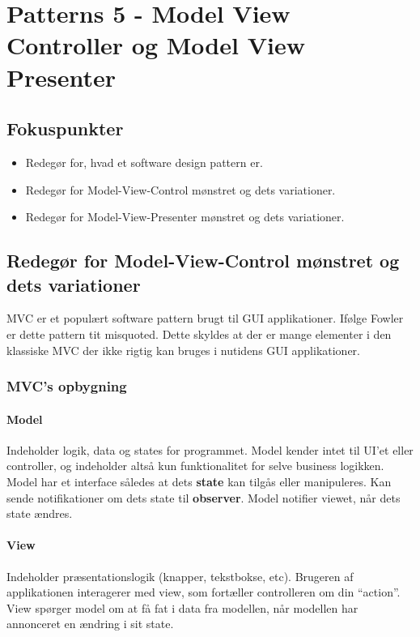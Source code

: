 \section{Patterns 5 - Model View Controller og Model View Presenter}

\subsection{Fokuspunkter}

\begin{itemize}
	\item Redegør for, hvad et software design pattern er.
	\item Redegør for Model-View-Control mønstret og dets variationer.
	\item Redegør for Model-View-Presenter mønstret og dets variationer.
\end{itemize}



\subsection{Redegør for Model-View-Control mønstret og dets variationer}
MVC er et populært software pattern brugt til GUI applikationer. Ifølge Fowler er dette pattern tit misquoted. Dette skyldes at der er mange elementer i den klassiske MVC der ikke rigtig kan bruges i nutidens GUI applikationer.

\subsubsection{MVC's opbygning}
\paragraph{Model} Indeholder logik, data og states for programmet. Model kender intet til UI’et eller controller, og indeholder altså kun funktionalitet for selve business logikken. Model har et interface således at dets \textbf{state} kan tilgås eller manipuleres. Kan sende notifikationer om dets state til \textbf{observer}. Model notifier viewet, når dets state ændres.

\paragraph{View} Indeholder præsentationslogik (knapper, tekstbokse, etc). Brugeren af applikationen interagerer med view, som fortæller controlleren om din “action”. View spørger model om at få fat i data fra modellen, når modellen har annonceret en ændring i sit state.

